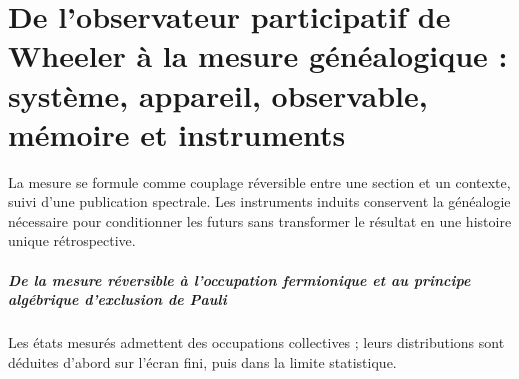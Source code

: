 \chapter{De l’observateur participatif de Wheeler à la mesure généalogique : système, appareil, observable, mémoire et instruments}
\label{chap:parte-iv-54}

La mesure se formule comme couplage réversible entre une section et un contexte, suivi d’une publication spectrale. Les instruments induits conservent la généalogie nécessaire pour conditionner les futurs sans transformer le résultat en une histoire unique rétrospective.





\paragraph{De la mesure réversible à l’occupation fermionique et au principe algébrique d’exclusion de Pauli} Les états mesurés admettent des occupations collectives ; leurs distributions sont déduites d’abord sur l’écran fini, puis dans la limite statistique.
